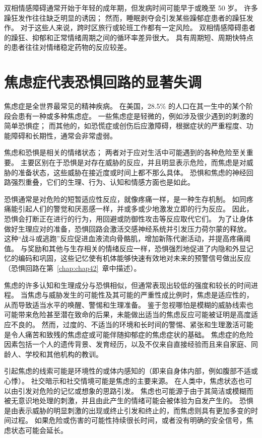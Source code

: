 双相情感障碍通常开始于年轻的成年期，但发病时间可能早于或晚至 50 岁。
许多躁狂发作往往缺乏明显的诱因；
然而，睡眠剥夺会引发某些躁郁症患者的躁狂发作。
对于这些人来说，跨时区旅行或轮班工作都有一定风险。
双相情感障碍患者的躁狂、抑郁和正常情绪周期之间的循环率差异很大。
具有周期短、周期快特点的患者往往对情绪稳定药物的反应较差。



\section{焦虑症代表恐惧回路的显著失调}

焦虑症是全世界最常见的精神疾病。
在美国，28.5\% 的人口在其一生中的某个阶段会患有一种或多种焦虑症。
一些焦虑症是轻微的，例如涉及很少遇到的刺激的简单恐惧症；
而其他的，如恐慌症或创伤后应激障碍，根据症状的严重程度、功能障碍和长期性，通常会非常虚弱。


焦虑和恐惧是相关的情绪状态；
两者对于应对生活中可能遇到的各种危险至关重要。
主要区别在于恐惧是对存在威胁的反应，并且明显表示危险，而焦虑是对威胁的准备状态，这些威胁在接近度或时间上都不那么具体。
恐惧和焦虑的神经回路强烈重叠，它们的生理、行为、认知和情感方面也是如此。


恐惧通常是对危险的短暂适应性反应，就像疼痛一样，是一种生存机制。
如同疼痛能引起人们的警觉和厌恶感一样，并或多或少地激发立即的行为反应。
因此，恐惧会打断正在进行的行为，用回避或防御性攻击等反应取代它们。
为了让身体做好生理应对的准备，恐惧回路会激活交感神经系统并引发压力荷尔蒙的释放。
这种“战斗或逃跑”反应促进血液流向骨骼肌，增加新陈代谢活动，并提高疼痛阈值。
与奖励和其他与生存相关的情绪反应一样，恐惧强烈地促进了内隐和外显记忆的编码和巩固，这些记忆使有机体能够快速有效地对未来的预警信号做出反应（恐惧回路在第~\ref{chap:chap42}~章中描述）。


焦虑的许多认知和生理成分与恐惧相似，但通常表现出较低的强度和较长的时间进程。
当焦虑与威胁发生的可能性及其可能的严重性成比例时，焦虑是适应性的，从而导致适当水平的唤醒、警惕和生理准备。
鉴于忽视哪怕是模糊的威胁线索也可能带来危险甚至潜在致命的后果，未能做出适当的焦虑反应可能被证明是高度适应不良的。
然而，过度的、不适当的环境和长时间的警惕、紧张和生理激活可能是令人痛苦和致残的焦虑症或可能伴随抑郁症的焦虑症状的基础。
焦虑症的危险因素包括一个人的遗传背景、发育经历，以及不仅来自直接经验而且来自家庭、同龄人、学校和其他机构的教训。


引起焦虑的线索可能是环境性的或体内感知的（即来自身体内部，例如腹部不适或心悸）。
社交暗示和社交情境可能是焦虑的主要来源。
在人类中，焦虑状态也可以由引发对危险的记忆或想象的思路引发。
焦虑也可能源于由于其简洁或模糊而被无意识地处理的刺激，并且由此产生的情绪可能会被体验为自发产生的。
恐惧是由表示威胁的明显刺激的出现或终止引发和终止的，而焦虑则具有更加多变的时间过程。
如果危险或伤害的可能性持续很长时间，或者没有明确的安全信号，焦虑状态可能会延长。


